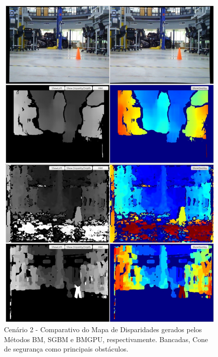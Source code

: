 \begin{figure}[H]
 	\centering
 	\includegraphics[scale=0.35]{./Resources/results/scene2_montage.jpg}
 	\caption{Cenário 2 - Comparativo do Mapa de Disparidades gerados pelos Métodos BM, SGBM e BMGPU, respectivamente. Bancadas, Cone de segurança como principais obstáculos.}
 	\label{scene2_montage}
\end{figure}

